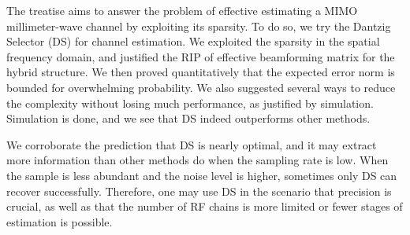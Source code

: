 
\startchapter [title={Conclusion}]

The treatise aims to answer the problem of effective estimating a MIMO millimeter-wave channel by exploiting its sparsity.
To do so, we try the Dantzig Selector (DS) for channel estimation.
We exploited the sparsity in the spatial frequency domain, and justified the RIP of effective beamforming matrix for the hybrid structure.
We then proved quantitatively that the expected error norm is bounded for overwhelming probability.
We also suggested several ways to reduce the complexity without losing much performance, as justified by simulation.
Simulation is done, and we see that DS indeed outperforms other methods.

We corroborate the prediction that DS is nearly optimal, and it may extract more information than other methods do when the sampling rate is low.
When the sample is less abundant and the noise level is higher, sometimes only DS can recover successfully.
Therefore, one may use DS in the scenario that precision is crucial, as well as that the number of RF chains is more limited or fewer stages of estimation is possible.


\stopchapter



